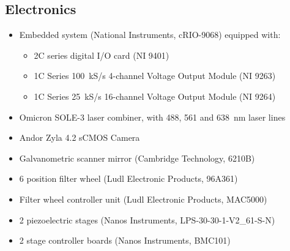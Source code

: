 \begin{singlespace}
\subsection*{Electronics}

  \begin{itemize}
    \item Embedded system (National Instruments, cRIO-9068) equipped with:
    \begin{itemize}
      \item 2\texttimes C series digital I/O card (NI 9401)
      \item 1\texttimes C Series \SI{100}{kS/s} 4-channel Voltage Output Module (NI 9263)
      \item 1\texttimes C Series \SI{25}{kS/s} 16-channel Voltage Output Module (NI 9264)
    \end{itemize}
    \item Omicron SOLE-3 laser combiner, with 488, 561 and \SI{638}{nm} laser lines
    \item Andor Zyla 4.2 sCMOS Camera
    \item Galvanometric scanner mirror (Cambridge Technology, 6210B)
    \item 6 position filter wheel (Ludl Electronic Products, 96A361)
    \item Filter wheel controller unit (Ludl Electronic Products, MAC5000)
    \item 2 piezoelectric stages (Nanos Instruments, LPS-30-30-1-V2\_61-S-N) 
    \item 2 stage controller boards (Nanos Instruments, BMC101)
  \end{itemize}
\end{singlespace}